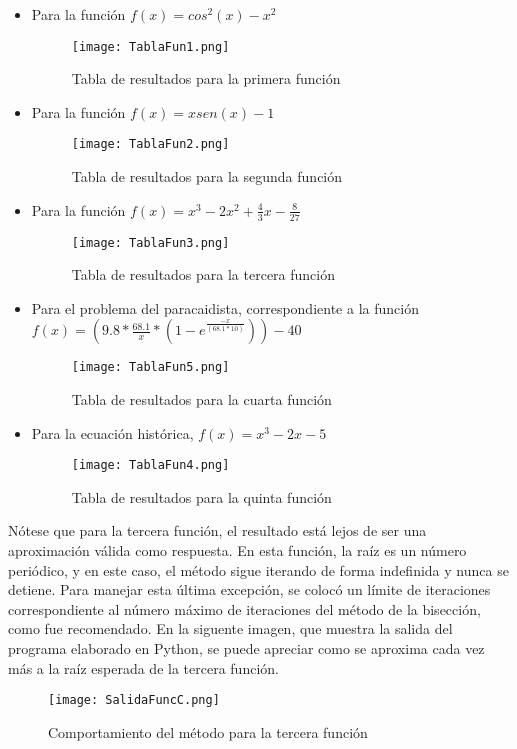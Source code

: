 \documentclass{article}
\begin{document}
\begin{itemize}
    \item Para la función \(f(x) = cos^2(x)-x^2\)
        \begin{figure}[H]
        \centering
        \texttt{[image: TablaFun1.png]}
        \caption{Tabla de resultados para la primera función}
        \label{fig:TablaFun1}
        \end{figure}
    \item Para la función \(f(x) = xsen(x)-1\)
        \begin{figure}[H]
        \centering
        \texttt{[image: TablaFun2.png]}
        \caption{Tabla de resultados para la segunda función}
        \label{fig:TablaFun2}
        \end{figure}
    \item Para la función \(f(x) = x^3-2x^2+\frac{4}{3}x-\frac{8}{27}\)
        \begin{figure}[H]
        \centering
        \texttt{[image: TablaFun3.png]}
        \caption{Tabla de resultados para la tercera función}
        \label{fig:TablaFun3}
        \end{figure}
    \item Para el problema del paracaidista, correspondiente a la función  \(f(x) = (9.8*\frac{68.1}{x}*(1-e^\frac{-x}{(68.1*10)}))-40\)
        \begin{figure}[H]
        \centering
        \texttt{[image: TablaFun5.png]}
        \caption{Tabla de resultados para la cuarta función}
        \label{fig:TablaFun5}
        \end{figure}
    \item Para la ecuación histórica, \(f(x) = x^3-2x-5\)
        \begin{figure}[H]
        \centering
        \texttt{[image: TablaFun4.png]}
        \caption{Tabla de resultados para la quinta función}
        \label{fig:TablaFun4}
        \end{figure}
\end{itemize}
Nótese que para la tercera función, el resultado está lejos de ser una aproximación válida como respuesta. En esta función, la raíz es un número periódico, y en este caso, el método sigue iterando de forma indefinida y nunca se detiene. Para manejar esta última excepción, se colocó un límite de iteraciones correspondiente al número máximo de iteraciones del método de la bisección, como fue recomendado. En la siguente imagen, que muestra la salida del programa elaborado en Python, se puede apreciar como se aproxima cada vez más a la raíz esperada de la tercera función.
\begin{figure}[H]
\centering
\texttt{[image: SalidaFuncC.png]}
\caption{Comportamiento del método para la tercera función}
\label{fig:SalidaFuncC}
\end{figure}
\end{document}
